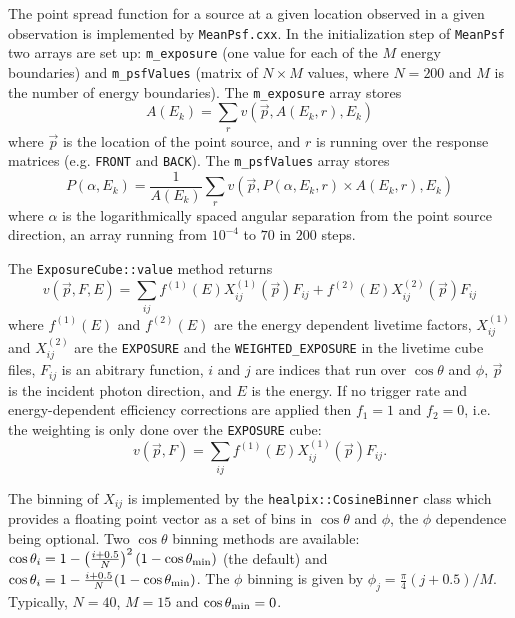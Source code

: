 \documentclass{article}[12pt,a4]
\begin{document}
The point spread function for a source at a given location observed in a given
observation is implemented by {\tt MeanPsf.cxx}.
In the initialization step of {\tt MeanPsf} two arrays are set up:
{\tt m\_exposure} (one value for each of the $M$ energy boundaries) and
{\tt m\_psfValues} (matrix of $N \times M$ values, where $N=200$ and $M$ is
the number of energy boundaries).
The {\tt m\_exposure} array stores
\begin{equation}
A(E_k) = \sum_r v(\vec{p}, A(E_k, r), E_k)
\end{equation}
where 
$\vec{p}$ is the location of the point source, and
$r$ is running over the response matrices (e.g. {\tt FRONT} and {\tt BACK}).
The {\tt m\_psfValues} array stores
\begin{equation}
P(\alpha, E_k) = \frac{1}{A(E_k)} \sum_r v(\vec{p}, P(\alpha, E_k, r) \times A(E_k, r), E_k)
\end{equation}
where
$\alpha$ is the logarithmically spaced angular separation from the point
source direction, an array running from $10^{-4}$ to $70$ in $200$ steps.

The {\tt ExposureCube::value} method returns
\begin{equation}
v(\vec{p}, F, E) = \sum_{ij} f^{(1)}(E) X_{ij}^{(1)}(\vec{p}) F_{ij} + f^{(2)}(E) X_{ij}^{(2)}(\vec{p}) F_{ij}
\end{equation}
where 
$f^{(1)}(E)$ and $f^{(2)}(E)$ are the energy dependent livetime factors,
$X_{ij}^{(1)}$ and $X_{ij}^{(2)}$ are the {\tt EXPOSURE} and the 
{\tt WEIGHTED\_EXPOSURE} in the livetime cube files,
$F_{ij}$ is an abitrary function,
$i$ and $j$ are indices that run over $\cos \theta$ and $\phi$,
$\vec{p}$ is the incident photon direction, and
$E$ is the energy.
If no trigger rate and energy-dependent efficiency corrections are
applied then $f_1=1$ and $f_2=0$, i.e. the weighting is only done
over the {\tt EXPOSURE} cube:
\begin{equation}
v(\vec{p}, F) = \sum_{ij} f^{(1)}(E) X_{ij}^{(1)}(\vec{p}) F_{ij} .
\end{equation}

The binning of $X_{ij}$ is implemented by the {\tt healpix::CosineBinner} class which
provides a floating point vector as a set of bins in $\cos \theta$ and $\phi$, the
$\phi$ dependence being optional.
Two $\cos \theta$ binning methods are available:
$\cos \theta_i = 1 - \left( \frac{i+0.5}{N} \right)^2 (1 - \cos \theta_{\rm min})$
(the default) and
$\cos \theta_i = 1 - \frac{i+0.5}{N} (1 - \cos \theta_{\rm min})$.
The $\phi$ binning is given by
$\phi_j = \frac{\pi}{4} (j+0.5) / M$.
Typically, $N=40$, $M=15$ and $\cos \theta_{\rm min} = 0$.
\end{document}
